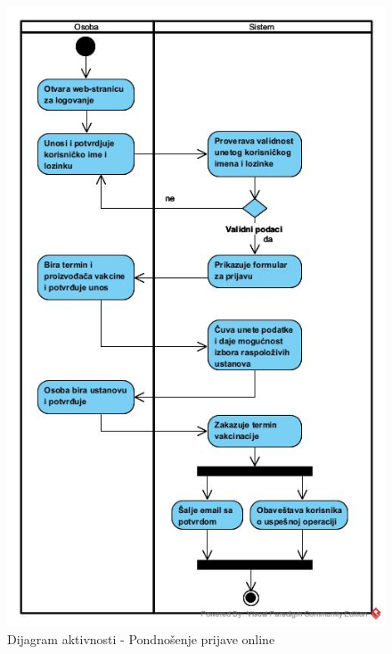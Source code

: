 \documentclass[titlepage]{article}
\begin{document}
\begin{figure}[H]
\centering
\includegraphics[scale=0.7]{Podnosenje_prijave_online}
\caption{Dijagram aktivnosti - Pondnošenje prijave online}
\end{figure}
\end{document}
